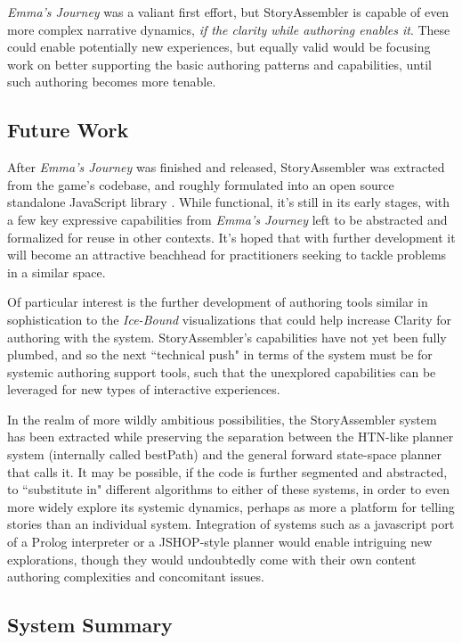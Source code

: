 \textit{Emma's Journey} was a valiant first effort, but StoryAssembler is capable of even more complex narrative dynamics, \textit{if the clarity while authoring enables it}. These could enable potentially new experiences, but equally valid would be focusing work on better supporting the basic authoring patterns and capabilities, until such authoring becomes more tenable.

\subsection{Future Work}

After \textit{Emma's Journey} was finished and released, StoryAssembler was extracted from the game's codebase, and roughly formulated into an open source standalone JavaScript library \cite{github_storyassembler}. While functional, it's still in its early stages, with a few key expressive capabilities from \textit{Emma's Journey} left to be abstracted and formalized for reuse in other contexts. It's hoped that with further development it will become an attractive beachhead for practitioners seeking to tackle problems in a similar space.

Of particular interest is the further development of authoring tools similar in sophistication to the \textit{Ice-Bound} visualizations that could help increase Clarity for authoring with the system. StoryAssembler's capabilities have not yet been fully plumbed, and so the next ``technical push" in terms of the system must be for systemic authoring support tools, such that the unexplored capabilities can be leveraged for new types of interactive experiences.

In the realm of more wildly ambitious possibilities, the StoryAssembler system has been extracted while preserving the separation between the HTN-like planner system (internally called bestPath) and the general forward state-space planner that calls it. It may be possible, if the code is further segmented and abstracted, to ``substitute in" different algorithms to either of these systems, in order to even more widely explore its systemic dynamics, perhaps as more a platform for telling stories than an individual system. Integration of systems such as a javascript port of a Prolog interpreter or a JSHOP-style planner would enable intriguing new explorations, though they would undoubtedly come with their own content authoring complexities and concomitant issues.

\subsection{System Summary}


